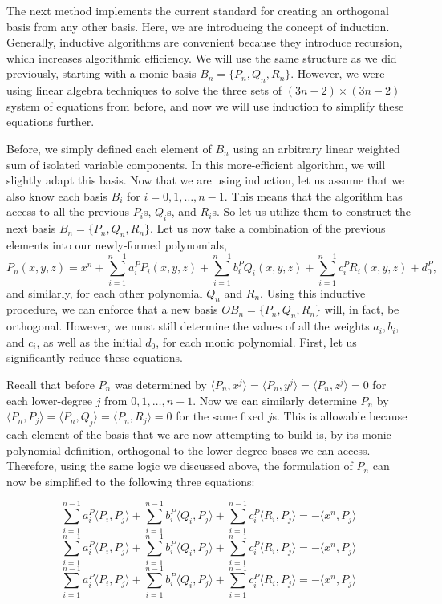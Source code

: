 \documentclass[letterpaper, 12pt]{article}
\begin{document}
The next method implements the current standard for creating an orthogonal basis from any other basis. Here, we are introducing the concept of induction. Generally, inductive algorithms are convenient because they introduce recursion, which increases algorithmic efficiency. We will use the same structure as we did previously, starting with a monic basis $B_n = \{P_n, Q_n, R_n\}$. However, we were using linear algebra techniques to solve the three sets of $(3n-2)\times(3n-2)$ system of equations from before, and now we will use induction to simplify these equations further.

Before, we simply defined each element of $B_n$ using an arbitrary linear weighted sum of isolated variable components. In this more-efficient algorithm, we will slightly adapt this basis. Now that we are using induction, let us assume that we also know each basis $B_i$ for $i = 0, 1, \ldots, n-1$. This means that the algorithm has access to all the previous $P_i$s, $Q_i$s, and $R_i$s. So let us utilize them to construct the next basis $B_n =  \{P_n, Q_n, R_n\}$. Let us now take a combination of the previous elements into our newly-formed polynomials,
$$P_n(x, y, z) = x^n + \sum_{i=1}^{n-1} a_i^PP_i(x,y,z) + \sum_{i=1}^{n-1} b_i^PQ_i(x,y,z) + \sum_{i=1}^{n-1} c_i^PR_i(x,y,z) +d_0^P,$$ and similarly, for each other polynomial $Q_n$ and $R_n$. Using this inductive procedure, we can enforce that a new basis $OB_n = \{P_n, Q_n, R_n\}$ will, in fact, be orthogonal. However, we must still determine the values of all the weights $a_i, b_i$, and $c_i$, as well as the initial $d_0$, for each monic polynomial. First, let us significantly reduce these equations.

Recall that before $P_n$ was determined by $\langle P_n, x^j\rangle = \langle P_n, y^j\rangle = \langle P_n, z^j\rangle = 0$ for each lower-degree $j$ from  $0,1, \ldots, n-1$. Now we can similarly determine $P_n$ by $\langle P_n, P_j\rangle = \langle P_n, Q_j\rangle = \langle P_n, R_j\rangle = 0$ for the same fixed $j$s. This is allowable because each element of the basis that we are now attempting to build is, by its monic polynomial definition, orthogonal to the lower-degree bases we can access. Therefore, using the same logic we discussed above, the formulation of $P_n$ can now be simplified to the following three equations:

\newpage
\vspace*{-12mm}
$$\sum_{i=1}^{n-1} a_i^P\langle P_i, P_j \rangle + \sum_{i=1}^{n-1} b_i^P\langle Q_i, P_j \rangle + \sum_{i=1}^{n-1} c_i^P\langle R_i, P_j \rangle = -\langle x^n, P_j\rangle$$ 
$$\sum_{i=1}^{n-1} a_i^P\langle P_i, P_j \rangle + \sum_{i=1}^{n-1} b_i^P\langle Q_i, P_j \rangle + \sum_{i=1}^{n-1} c_i^P\langle R_i, P_j \rangle = -\langle x^n, P_j\rangle$$ 
$$\sum_{i=1}^{n-1} a_i^P\langle P_i, P_j \rangle + \sum_{i=1}^{n-1} b_i^P\langle Q_i, P_j \rangle + \sum_{i=1}^{n-1} c_i^P\langle R_i, P_j \rangle = -\langle x^n, P_j\rangle$$ 
\end{document}
